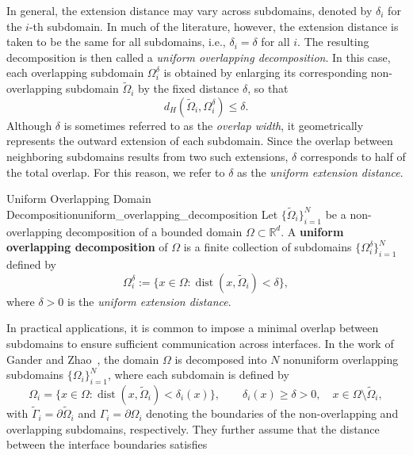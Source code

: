 \noindent In general, the extension distance may vary across subdomains, denoted by $\delta_i$ for the $i$-th subdomain. In much of the literature, however, the extension distance is taken to be the same for all subdomains, i.e., $\delta_i = \delta$ for all $i$. The resulting decomposition is then called a \textit{uniform overlapping decomposition}. In this case, each overlapping subdomain $\Omega_i^{\delta}$ is obtained by enlarging its corresponding non-overlapping subdomain $\widetilde{\Omega}_i$ by the fixed distance $\delta$, so that
\begin{equation*}
    d_H(\widetilde{\Omega}_i, \Omega_i^{\delta}) \leq \delta.
\end{equation*}
Although $\delta$ is sometimes referred to as the \textit{overlap width}, it geometrically represents the outward extension of each subdomain. Since the overlap between neighboring subdomains results from two such extensions, $\delta$ corresponds to half of the total overlap. For this reason, we refer to $\delta$ as the \textit{uniform extension distance}.
\begin{definition}{Uniform Overlapping Domain Decomposition}{uniform_overlapping_decomposition}
Let $\{\widetilde{\Omega}_i\}_{i=1}^N$ be a non-overlapping decomposition of a bounded domain $\Omega \subset \mathbb{R}^d$. A \textbf{uniform overlapping decomposition} of $\Omega$ is a finite collection of subdomains $\{\Omega_i^{\delta}\}_{i=1}^N$ defined by
\begin{equation*}
    \Omega_i^{\delta} := \{ x \in \Omega : \operatorname{dist}(x, \widetilde{\Omega}_i) < \delta \},
\end{equation*}
where $\delta > 0$ is the \textit{uniform extension distance}.
\end{definition}
\noindent In practical applications, it is common to impose a minimal overlap between subdomains to ensure sufficient communication across interfaces. In the work of Gander and Zhao~\cite{GanderZhao2002}, the domain $\Omega$ is decomposed into $N$ nonuniform overlapping subdomains $\{\Omega_i\}_{i=1}^N$, where each subdomain is defined by
\begin{equation*}
    \Omega_i = \{ x \in \Omega : \operatorname{dist}(x, \widetilde{\Omega}_i) < \delta_i(x) \}, \qquad \delta_i(x) \geq \delta > 0, \quad x \in \Omega \setminus \widetilde{\Omega}_i,
\end{equation*}
with $\widetilde{\Gamma}_i = \partial \widetilde{\Omega}_i$ and $\Gamma_i = \partial \Omega_i$ denoting the boundaries of the non-overlapping and overlapping subdomains, respectively. They further assume that the distance between the interface boundaries satisfies

